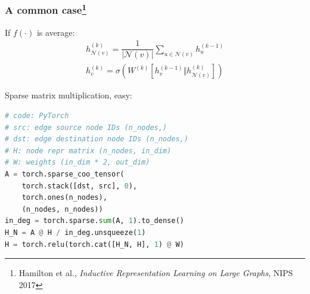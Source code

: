 \documentclass[10pt,aspectratio=169]{beamer}
\begin{document}
\begin{frame}
\begin{center}
		\end{center}
	\end{frame}

	\begin{frame}[fragile]
		\frametitle{A common case\footnote{Hamilton et al., \emph{Inductive Representation Learning on Large Graphs}, NIPS 2017}}
		\begin{minipage}{0.4\textwidth}
		If $f(\cdot)$ is average:
		$$
		\begin{gathered}
		h_{\mathcal{N}(v)}^{(k)} = \dfrac{1}{\left\lvert \mathcal{N}(v) \right\rvert}
		\sum_{u \in \mathcal{N}(v)} h^{(k-1)}_u \\
		h^{(k)}_v =
		\sigma \left( W^{(k)} \left[h_v^{(k-1)} \Vert h_{\mathcal{N}(v)}^{(k)}\right] \right)
		\end{gathered}
		$$
		\end{minipage}\hfill%
		\begin{minipage}{0.5\textwidth}
			Sparse matrix multiplication, easy:
\begin{lstlisting}[language=Python]
# code: PyTorch
# src: edge source node IDs (n_nodes,)
# dst: edge destination node IDs (n_nodes,)
# H: node repr matrix (n_nodes, in_dim)
# W: weights (in_dim * 2, out_dim)
A = torch.sparse_coo_tensor(
    torch.stack([dst, src], 0),
    torch.ones(n_nodes),
    (n_nodes, n_nodes))
in_deg = torch.sparse.sum(A, 1).to_dense()
H_N = A @ H / in_deg.unsqueeze(1)
H = torch.relu(torch.cat([H_N, H], 1) @ W)
\end{lstlisting}
		\end{minipage}
	\end{frame}
\end{document}

